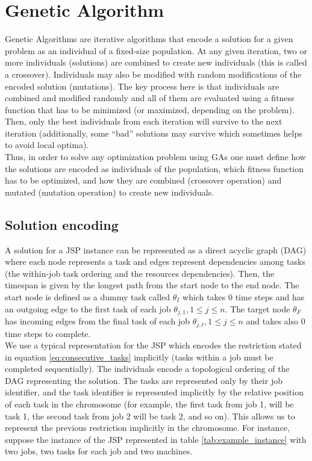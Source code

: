 \documentclass[10pt,a4paper]{article}
\begin{document}
\section{Genetic Algorithm}
Genetic Algorithms are iterative algorithms that encode a solution for a given problem as an individual of a fixed-size population. At any given iteration, two or more individuals (solutions) are combined to create new individuals (this is called a crossover). Individuals may also be modified with random modifications of the encoded solution (mutations). The key process here is that individuals are combined and modified randomly and all of them are evaluated using a fitness function that has to be minimized (or maximized, depending on the problem). Then, only the best individuals from each iteration will survive to the next iteration (additionally, some ``bad'' solutions may survive which sometimes helps to avoid local optima).\\

Thus, in order to solve any optimization problem using GAs one must define how the solutions are encoded as individuals of the population, which fitness function has to be optimized, and how they are combined (crossover operation) and mutated (mutation operation) to create new individuals.

\subsection{Solution encoding}
A solution for a JSP instance can be represented as a direct acyclic graph (DAG) where each node represents a task and edges represent dependencies among tasks (the within-job task ordering and the resources dependencies). Then, the timespan is given by the longest path from the start node to the end node. The start node is defined as a dummy task called $\theta_I$ which takes 0 time steps and has an outgoing edge to the first task of each job $\theta_{j,1}, 1 \leq j \leq n$. The target node $\theta_F$ has incoming edges from the final task of each job $\theta_{j,t}, 1 \leq j \leq n$ and takes also 0 time steps to complete.\\

We use a typical representation for the JSP which encodes the restriction stated in equation \ref{eq:consecutive_tasks} implicitly (tasks within a job must be completed sequentially). The individuals encode a topological ordering of the DAG representing the solution. The tasks are represented only by their job identifier, and the task identifier is represented implicitly by the relative position of each task in the chromosome (for example, the first task from job 1, will be task 1, the second task from job 2 will be task 2, and so on). This allows us to represent the previous restriction implicitly in the chromosome. For instance, suppose the instance of the JSP represented in table \ref{tab:example_instance} with two jobs, two tasks for each job and two machines.\\
\end{document}
